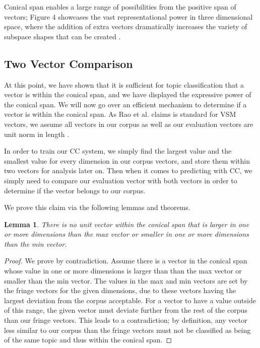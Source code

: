 \documentclass[11pt]{article}
\newtheorem{lemma}[theorem]{Lemma}
\begin{document}
Conical span enables a large range of possibilities from the positive span of vectors; Figure 4 showcases the vast representational power in three dimensional space, where the addition of extra vectors dramatically increases the variety of subspace shapes that can be created \cite{positivespanchart}.

\subsection{Two Vector Comparison}
At this point, we have shown that it is sufficient for topic classification that a vector is within the conical span, and we have displayed the expressive power of the conical span. We will now go over an efficient mechanism to determine if a vector is within the conical span. As Rao et al. claims is standard for VSM vectors, we assume all vectors in our corpus as well as our evaluation vectors are unit norm in length \cite{rao2018computational}.

In order to train our CC system, we simply find the largest value and the smallest value for every dimension in our corpus vectors, and store them within two vectors for analysis later on. Then when it comes to predicting with CC, we simply need to compare our evaluation vector with both vectors in order to determine if the vector belongs to our corpus.

We prove this claim via the following lemmas and theorems.

\begin{lemma}
There is no unit vector within the conical span that is larger in one or more dimensions than the max vector or smaller in one or more dimensions than the min vector.
\end{lemma}
\begin{proof}
We prove by contradiction. Assume there is a vector in the conical span whose value in one or more dimensions is larger than than the max vector or smaller than the min vector. The values in the max and min vectors are set by the fringe vectors for the given dimensions, due to these vectors having the largest deviation from the corpus acceptable. For a vector to have a value outside of this range, the given vector must deviate further from the rest of the corpus than our fringe vectors. This leads to a contradiction; by definition, any vector less similar to our corpus than the fringe vectors must not be classified as being of the same topic and thus within the conical span.
\end{proof}
\end{document}
